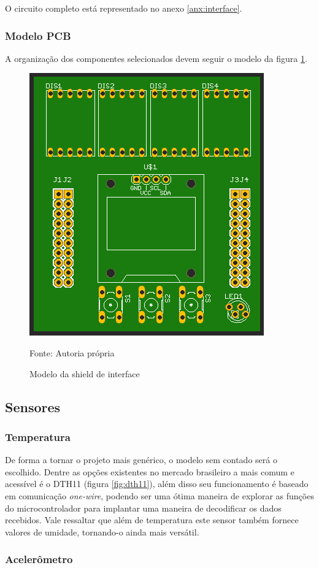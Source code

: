 O circuito completo está representado no anexo \ref{anx:interface}.

\subsubsection{Modelo PCB}

A organização dos componentes selecionados devem seguir o modelo da figura \ref{fig:interface_pcb}.

\begin{figure}[h!]
  \centering
    \includegraphics[width=.5\textwidth]{figuras/interface_pcb.png}
    \caption{Modelo da shield de interface} Fonte: Autoria própria
    \label{fig:interface_pcb}
\end{figure}

\subsection{Sensores}

\subsubsection*{Temperatura}

De forma a tornar o projeto mais genérico, o modelo sem contado será o escolhido. Dentre as opções existentes no mercado brasileiro a mais comum e acessível é o DTH11 (figura \ref{fig:dth11}), além disso seu funcionamento é baseado em comunicação \textit{one-wire}, podendo ser uma ótima maneira de explorar as funções do microcontrolador para implantar uma maneira de decodificar os dados recebidos. Vale ressaltar que além de temperatura este sensor também fornece valores de umidade, tornando-o ainda mais versátil.

\subsubsection*{Acelerômetro}

